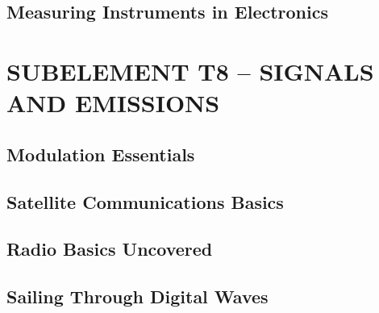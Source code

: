 \documentclass[12pt]{book}
\begin{document}
\section{Measuring Instruments in Electronics}










\chapter{SUBELEMENT T8 – SIGNALS AND EMISSIONS}
\section{Modulation Essentials}












\section{Satellite Communications Basics}












\section{Radio Basics Uncovered}











\section{Sailing Through Digital Waves}













\end{document}
